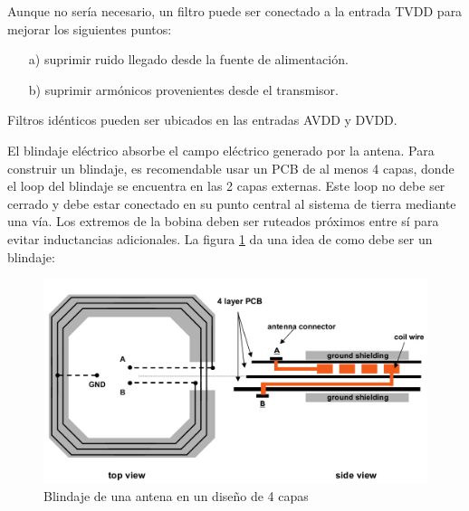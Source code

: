 \bigskip
{}

\bigskip
Aunque no sería necesario, un filtro puede ser conectado a la entrada TVDD para mejorar los siguientes puntos:

\begin{itemize}
\item[a)] suprimir ruido llegado desde la fuente de alimentación.
\item[b)] suprimir armónicos provenientes desde el transmisor.
\end{itemize}

Filtros idénticos pueden ser ubicados en las entradas AVDD y DVDD.

\newpage
{}

\bigskip
El blindaje eléctrico absorbe el campo eléctrico generado por la antena. Para construir un blindaje, es recomendable usar un PCB de al menos 4 capas, donde el loop del blindaje se encuentra en las 2 capas externas. Este loop no debe ser cerrado y debe estar conectado en su punto central al sistema de tierra mediante una vía. Los extremos de la bobina deben ser ruteados próximos entre sí para evitar inductancias adicionales.  La figura \ref{Fig:blindaje} da una idea de como debe ser un blindaje: 


\begin{figure}[H]
\centering
  \begin{center}
  \includegraphics[scale=.3]{Imagenes/anexo3.png} 
  \end{center}
  \caption{Blindaje de una antena en un diseño de 4 capas}\label{Fig:blindaje} 
\end{figure}

